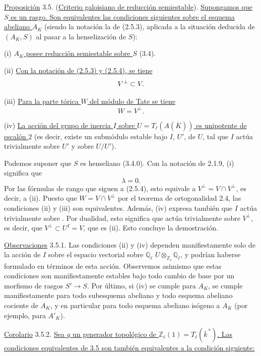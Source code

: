\par\medskip
\noindent
\underline{Proposición} 3.5. (\underline{Criterio galoisiano de
reducción semiestable}). \underline{Supongamos que $S$ es un rasgo. Son equivalentes
las condiciones siguientes sobre el esquema abeliano $A_K$} (siendo la
notación la de (2.5.3), aplicada a la situación deducida de $(A_K,S)$
al pasar a la henselización de $S$):

\smallskip
\noindent
(i) \underline{$A_K$ posee reducción semiestable sobre $S$} (3.4).

\smallskip
\noindent
(ii) \underline{Con la notación de (2.5.3) y (2.5.4), se tiene}
\[
 \sisi{V\subset V^\perp}{V^\perp\subset V}.
\]

\noindent
(iii) \underline{Para la parte tórica $W$ del módulo de Tate se tiene}
\[
 W=V^\perp.
\]

\noindent
(iv) \underline{La acción del grupo de inercia $I$ sobre
$U=T_\ell(A(\overline K))$ es unipotente de escalón $2$} (es decir,
existe un submódulo estable bajo $I$, $U'$, de $U$, tal que $I$ actúa
trivialmente sobre $U'$ y sobre $U/U'$).

Podemos suponer que $S$ es henseliano (3.4.0). Con la notación de
2.1.9, (i) significa que
\[
 \lambda=0.
\]
Por las fórmulas de rango que siguen a (2.5.4), esto equivale a
$V^\perp=V\cap V^\perp$, es decir, a (ii). Puesto que
$W=V\cap V^\perp$ por el teorema de ortogonalidad 2.4, las condiciones
(ii) y (iii) son equivalentes. Además, (iv) expresa también que $I$
actúa trivialmente sobre
. Por dualidad, esto significa que actúa
trivialmente sobre $V^\perp$, es decir, que
$V^\perp\subset U^I=V$, que es (ii). Esto concluye la demostración.

\medskip
\noindent
\underline{Observaciones} 3.5.1. Las condiciones (ii) y (iv) dependen
manifiestamente solo de la acción de $I$ sobre el espacio vectorial
sobre $\mathbb Q_\ell$
$U\otimes_{\mathbb Z_\ell}\mathbb Q_\ell$, y podrían haberse formulado
en términos de esta acción. Observemos asimismo que estas condiciones
son manifiestamente estables bajo todo cambio de base por un morfismo
de rasgos $S'\longrightarrow S$. Por último, si (iv) se cumple para
$A_K$, se cumple manifiestamente para todo subesquema abeliano y todo
esquema abeliano cociente de $A_K$, y en particular para todo esquema
abeliano isógeno a $A_K$ (por ejemplo, para $A'_K$).

\medskip
\noindent
\underline{Corolario} 3.5.2. \underline{Sea $g$ un generador topológico
de $\mathbb Z_\ell(1)=T_\ell(\overline k^{\,*})$. Las condiciones
equivalentes de 3.5 son también equivalentes a la condición siguiente:}


